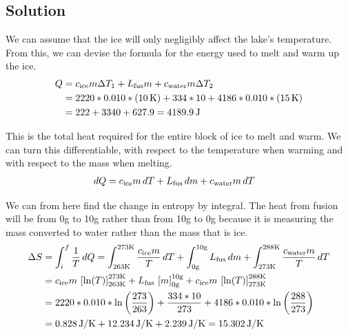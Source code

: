 \documentclass[12pt]{article}
\begin{document}
        \subsection{Solution}
            We can assume that the ice will only negligibly affect the lake's temperature.
            From this, we can devise the formula for the energy used to melt and warm up the ice.
            \begin{align}
                Q   &=  c_{\rm ice} m \Delta T_1 + L_{\rm fus} m + c_{\rm water} m \Delta T_2\\
                    &=  2220 * 0.010 * (10\,\unit{\kelvin}) + 334 * 10 + 4186 * 0.010 * (15\,\unit{\kelvin})\\
                    &=  222 + 3340 + 627.9
                    =   4189.9\,\unit{\joule}
            \end{align}

            This is the total heat required for the entire block of ice to melt and warm.
            We can turn this differentiable, with respect to the temperature when warming and with respect to the mass when melting.
            \begin{align}
                dQ  &=  c_{\rm ice} m\,dT + L_{\rm fus}\,dm + c_{\rm water} m\,dT
            \end{align}

            We can from here find the change in entropy by integral.
            The heat from fusion will be from 0g to 10g rather than from 10g to 0g because it is measuring the mass converted to water rather than the mass that is ice.
            \begin{align}
                \Delta S    &=  \int_{i}^{f}\frac{1}{T}\,dQ
                    =   \int_{263\unit{\kelvin}}^{273\unit{\kelvin}} \frac{c_{\rm ice} m}{T}\,dT
                        +   \int_{0\unit{\gram}}^{10\unit{\gram}} L_{\rm fus}\,dm
                        +   \int_{273\unit{\kelvin}}^{288\unit{\kelvin}} \frac{c_{\rm water} m}{T}\,dT\\
                    &=  c_{\rm ice} m\,\left[ \ln(T) \right]_{263\unit{\kelvin}}^{273\unit{\kelvin}} + L_{\rm fus}\,\left[ m \right]_{0\unit{\gram}}^{10\unit{\gram}} + c_{\rm ice} m\,\left[ \ln(T) \right]_{273\unit{\kelvin}}^{288\unit{\kelvin}}\\
                    &=  2220 * 0.010 * \ln\left( \frac{273}{263} \right) + \frac{334 * 10}{273} + 4186 * 0.010 * \ln\left( \frac{288}{273} \right)\\
                    &=  0.828\,\unit{\joule/\kelvin} + 12.234\,\unit{\joule/\kelvin} + 2.239\,\unit{\joule/\kelvin}
                    =   15.302\,\unit{\joule/\kelvin}
            \end{align}
\end{document}
